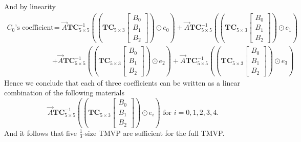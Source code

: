 \documentclass[
11pt,notheorems,hyperref={pdfauthor=whatever}
]{beamer}
\begin{document}
\begin{frame}
    And by linearity
    \[\begin{aligned}
            C_{0}\text{'s coefficient} &= \vec{A} \mathbf{TC}_{5\times 5}^{-1} 
            \left(\left(\mathbf{TC}_{5\times 3}\begin{bmatrix}B_{0}\\B_{1}\\B_{2}\end{bmatrix}\right)\odot e_{0} \right)
            +
            \vec{A} \mathbf{TC}_{5\times 5}^{-1} 
            \left(\left(\mathbf{TC}_{5\times 3}\begin{bmatrix}B_{0}\\B_{1}\\B_{2}\end{bmatrix}\right)\odot e_{1} \right)
            \\&+
            \vec{A} \mathbf{TC}_{5\times 5}^{-1} 
            \left(\left(\mathbf{TC}_{5\times 3}\begin{bmatrix}B_{0}\\B_{1}\\B_{2}\end{bmatrix}\right)\odot e_{2} \right)
            +
            \vec{A} \mathbf{TC}_{5\times 5}^{-1} 
            \left(\left(\mathbf{TC}_{5\times 3}\begin{bmatrix}B_{0}\\B_{1}\\B_{2}\end{bmatrix}\right)\odot e_{3} \right)
    \end{aligned}
    \]
    Hence we conclude that each of three coefficients can be written as a linear combination of the following materials
    \[
        \vec{A} \mathbf{TC}_{5\times 5}^{-1} 
        \left(\left(\mathbf{TC}_{5\times 3}\begin{bmatrix}B_{0}\\B_{1}\\B_{2}\end{bmatrix}\right)\odot e_{i} \right)
        \text{ for }i=0,1,2,3,4.
    \]
    And it follows that five $\frac13$-size TMVP are sufficient for the full TMVP.
\end{frame}
\end{document}
